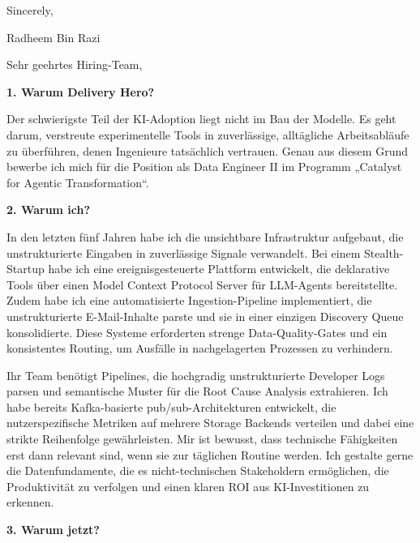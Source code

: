 \documentclass[11pt,a4paper]{coverletter}
\begin{document}
\closing{Sincerely,}{Radheem Bin Razi}

\clearpage
{}


\opening{Sehr geehrtes Hiring-Team,}

\vspace{8pt}\noindent\textbf{1. Warum Delivery Hero?}\par\vspace{3pt}

Der schwierigste Teil der KI-Adoption liegt nicht im Bau der Modelle. Es geht darum, verstreute experimentelle Tools in zuverlässige, alltägliche Arbeitsabläufe zu überführen, denen Ingenieure tatsächlich vertrauen. Genau aus diesem Grund bewerbe ich mich für die Position als Data Engineer II im Programm „Catalyst for Agentic Transformation“.

\vspace{8pt}\noindent\textbf{2. Warum ich?}\par\vspace{3pt}

In den letzten fünf Jahren habe ich die unsichtbare Infrastruktur aufgebaut, die unstrukturierte Eingaben in zuverlässige Signale verwandelt. Bei einem Stealth-Startup habe ich eine ereignisgesteuerte Plattform entwickelt, die deklarative Tools über einen Model Context Protocol Server für LLM-Agents bereitstellte. Zudem habe ich eine automatisierte Ingestion-Pipeline implementiert, die unstrukturierte E-Mail-Inhalte parste und sie in einer einzigen Discovery Queue konsolidierte. Diese Systeme erforderten strenge Data-Quality-Gates und ein konsistentes Routing, um Ausfälle in nachgelagerten Prozessen zu verhindern.

Ihr Team benötigt Pipelines, die hochgradig unstrukturierte Developer Logs parsen und semantische Muster für die Root Cause Analysis extrahieren. Ich habe bereits Kafka-basierte pub/sub-Architekturen entwickelt, die nutzerspezifische Metriken auf mehrere Storage Backends verteilen und dabei eine strikte Reihenfolge gewährleisten. Mir ist bewusst, dass technische Fähigkeiten erst dann relevant sind, wenn sie zur täglichen Routine werden. Ich gestalte gerne die Datenfundamente, die es nicht-technischen Stakeholdern ermöglichen, die Produktivität zu verfolgen und einen klaren ROI aus KI-Investitionen zu erkennen.

\vspace{8pt}\noindent\textbf{3. Warum jetzt?}\par\vspace{3pt}
\end{document}
